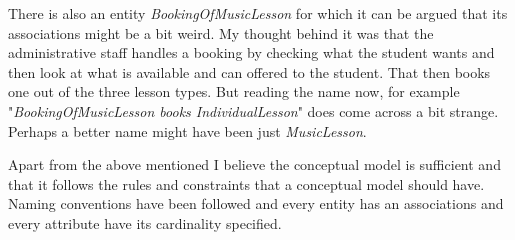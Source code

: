 \documentclass[a4paper]{scrreprt}
\begin{document}
There is also an entity \textit{BookingOfMusicLesson} for which it can be argued that its associations might be a bit weird.
My thought behind it was that the administrative staff handles a booking by checking what the student wants and then look at
what is available and can offered to the student. That then books one out of the three lesson types. But reading the name now,
for example "\textit{BookingOfMusicLesson books IndividualLesson}" does come across a bit strange. Perhaps a better name might
have been just \textit{MusicLesson}.

Apart from the above mentioned I believe the conceptual model is sufficient and that it follows the rules and constraints that
a conceptual model should have. Naming conventions have been followed and every entity has an associations and every attribute
have its cardinality specified.
\end{document}
